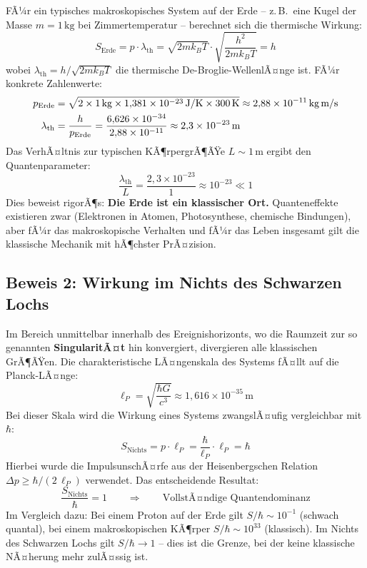 ﻿\documentclass[12pt,a4paper]{report}
\begin{document}
FÃ¼r ein typisches makroskopisches System auf der Erde -- z.\,B.\ eine Kugel der Masse $m = 1\,\text{kg}$ bei Zimmertemperatur -- berechnet sich die thermische Wirkung:
\begin{equation}
    S_{\text{Erde}} = p \cdot \lambda_{\text{th}} = \sqrt{2mk_BT} \cdot \sqrt{\frac{h^2}{2mk_BT}} = h
    \label{eq:wirkung_erde_1}
\end{equation}
wobei $\lambda_{\text{th}} = h/\sqrt{2mk_BT}$ die thermische De-Broglie-WellenlÃ¤nge ist. FÃ¼r konkrete Zahlenwerte:
\begin{align}
    p_{\text{Erde}} &= \sqrt{2 \times 1\,\text{kg} \times 1{,}381 \times 10^{-23}\,\text{J/K} \times 300\,\text{K}} \approx 2{,}88 \times 10^{-11}\,\text{kg\,m/s} \\
    \lambda_{\text{th}} &= \frac{h}{p_{\text{Erde}}} = \frac{6{,}626 \times 10^{-34}}{2{,}88 \times 10^{-11}} \approx 2{,}3 \times 10^{-23}\,\text{m}
\end{align}
Das VerhÃ¤ltnis zur typischen KÃ¶rpergrÃ¶ÃŸe $L \sim 1\,\text{m}$ ergibt den Quantenparameter:
\begin{equation}
    \frac{\lambda_{\text{th}}}{L} = \frac{2{,}3 \times 10^{-23}}{1} \approx 10^{-23} \ll 1
    \label{eq:quanten_erde}
\end{equation}
Dies beweist rigorÃ¶s: \textbf{Die Erde ist ein klassischer Ort.} Quanteneffekte existieren zwar (Elektronen in Atomen, Photosynthese, chemische Bindungen), aber fÃ¼r das makroskopische Verhalten und fÃ¼r das Leben insgesamt gilt die klassische Mechanik mit hÃ¶chster PrÃ¤zision.

\subsection{Beweis 2: Wirkung im Nichts des Schwarzen Lochs}

Im Bereich unmittelbar innerhalb des Ereignishorizonts, wo die Raumzeit zur so genannten \textbf{SingularitÃ¤t} hin konvergiert, divergieren alle klassischen GrÃ¶ÃŸen. Die charakteristische LÃ¤ngenskala des Systems fÃ¤llt auf die Planck-LÃ¤nge:
\begin{equation}
    \ell_P = \sqrt{\frac{\hbar G}{c^3}} \approx 1{,}616 \times 10^{-35}\,\text{m}
    \label{eq:planck_laenge}
\end{equation}
Bei dieser Skala wird die Wirkung eines Systems zwangslÃ¤ufig vergleichbar mit $\hbar$:
\begin{equation}
    S_{\text{Nichts}} = p \cdot \ell_P = \frac{\hbar}{\ell_P} \cdot \ell_P = \hbar
    \label{eq:wirkung_nichts}
\end{equation}
Hierbei wurde die ImpulsunschÃ¤rfe aus der Heisenbergschen Relation $\Delta p \geq \hbar / (2\,\ell_P)$ verwendet. Das entscheidende Resultat:
\begin{equation}
    \boxed{\frac{S_{\text{Nichts}}}{\hbar} = 1 \qquad \Longrightarrow \qquad \text{VollstÃ¤ndige Quantendominanz}}
\end{equation}
Im Vergleich dazu: Bei einem Proton auf der Erde gilt $S/\hbar \sim 10^{-1}$ (schwach quantal), bei einem makroskopischen KÃ¶rper $S/\hbar \sim 10^{33}$ (klassisch). Im Nichts des Schwarzen Lochs gilt $S/\hbar \rightarrow 1$ -- dies ist die Grenze, bei der keine klassische NÃ¤herung mehr zulÃ¤ssig ist.
\end{document}
